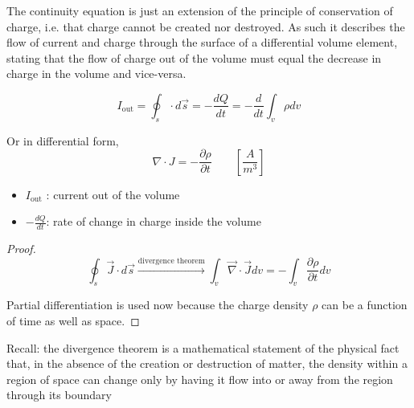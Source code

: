 \documentclass[10pt]{article}
\begin{document}
\begin{definition}
	The continuity equation is just an extension of the principle of conservation of charge, i.e. that charge cannot be created nor destroyed.
	As such it describes the flow of current and charge through the surface of a differential volume element, stating that the flow of charge out of the volume must equal the decrease in charge in the volume and vice-versa.


	\begin{equation}
		I_\text{out}  = \oint_s \cdot  d \vec{s} = - \frac{dQ}{dt} = - \frac{d}{dt} \int_v \rho dv
		\label{eq:259:current_continuity}
	\end{equation}

	Or in differential form,
	\begin{equation}
		\nabla \cdot J = -\frac{\partial \rho}{\partial t} \qquad [\frac{A}{m^3}] 
		\label{eq:259:current_continuity_diff}
	\end{equation}



	\begin{itemize}
		\item $ I_\text{out}  $ : current out of the volume
		\item $ -\frac{dQ}{dt} $: rate of change in charge inside the volume
	\end{itemize}
	
	\begin{proof}
		\begin{equation}
			\oint_s \vec{J} \cdot d \vec{s} \xrightarrow{\text{divergence theorem}} \int_v \vec{\nabla} \cdot \vec{J} dv = - \int _v \frac{\partial \rho}{\partial t} dv
			\label{eq:259:continuity_prf}
		\end{equation}

	Partial differentiation is used now because the charge density $ \rho $ can be a function of time as well as space.
	\end{proof}

\end{definition}

	Recall: the divergence theorem is a mathematical statement of the physical fact that, in the absence of the creation or destruction of matter, the density within a region of space can change only by having it flow into or away from the region through its boundary
\end{document}
